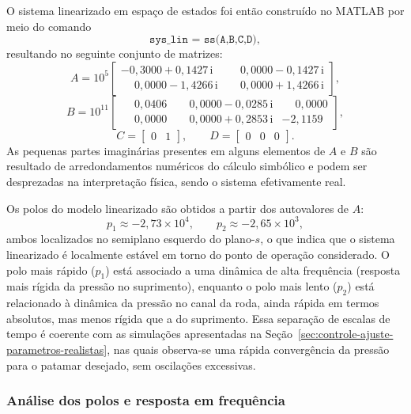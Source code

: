 O sistema linearizado em espaço de estados foi então construído no MATLAB por meio do comando
\[
    \texttt{sys\_lin = ss(A,B,C,D)},
\]
resultando no seguinte conjunto de matrizes:
\[
    A =
    10^{5}
    \begin{bmatrix}
        -0{,}3000 + 0{,}1427\,\mathrm{i} & \phantom{-}0{,}0000 - 0{,}1427\,\mathrm{i} \\
        \phantom{-}0{,}0000 - 1{,}4266\,\mathrm{i} & \phantom{-}0{,}0000 + 1{,}4266\,\mathrm{i}
    \end{bmatrix},
\]
\[
    B =
    10^{11}
    \begin{bmatrix}
        \phantom{-}0{,}0406 & \phantom{-}0{,}0000 - 0{,}0285\,\mathrm{i} & \phantom{-}0{,}0000 \\
        \phantom{-}0{,}0000 & \phantom{-}0{,}0000 + 0{,}2853\,\mathrm{i} & -2{,}1159
    \end{bmatrix},
\]
\[
    C = \begin{bmatrix} 0 & 1 \end{bmatrix},
    \qquad
    D = \begin{bmatrix} 0 & 0 & 0 \end{bmatrix}.
\]
As pequenas partes imaginárias presentes em alguns elementos de $A$ e $B$ são resultado de arredondamentos numéricos do cálculo simbólico e podem ser desprezadas na interpretação física, sendo o sistema efetivamente real.

Os polos do modelo linearizado são obtidos a partir dos autovalores de $A$:
\[
    p_1 \approx -2{,}73\times 10^{4},
    \qquad
    p_2 \approx -2{,}65\times 10^{3},
\]
ambos localizados no semiplano esquerdo do plano-$s$, o que indica que o sistema linearizado é localmente estável em torno do ponto de operação considerado. O polo mais rápido ($p_1$) está associado a uma dinâmica de alta frequência (resposta mais rígida da pressão no suprimento), enquanto o polo mais lento ($p_2$) está relacionado à dinâmica da pressão no canal da roda, ainda rápida em termos absolutos, mas menos rígida que a do suprimento. Essa separação de escalas de tempo é coerente com as simulações apresentadas na Seção~\ref{sec:controle-ajuste-parametros-realistas}, nas quais observa-se uma rápida convergência da pressão para o patamar desejado, sem oscilações excessivas.

\subsubsection*{Análise dos polos e resposta em frequência}

